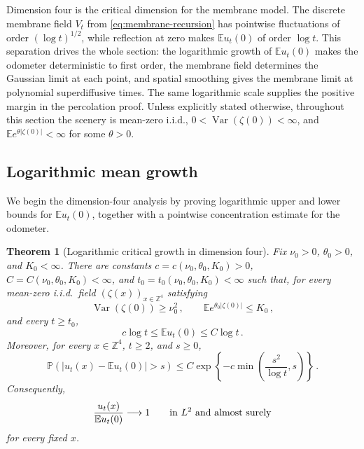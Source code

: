 \documentclass[11pt]{amsart}
\theoremstyle{plain}
\newtheorem{theorem}{Theorem}[section]
\theoremstyle{definition}
\newcommand{\Z}{\mathbb{Z}}
\newcommand{\E}{\mathbb{E}}
\renewcommand{\P}{\mathbb{P}}
\DeclareMathOperator{\Var}{Var}
\begin{document}
Dimension four is the critical dimension for the membrane model. The discrete
membrane field $V_t$ from \eqref{eq:membrane-recursion} has pointwise
fluctuations of order $(\log t)^{1/2}$, while reflection at zero makes
$\E u_t(0)$ of order $\log t$. This separation drives the
whole section: the logarithmic growth of $\E u_t(0)$ makes the odometer deterministic to first
order, the membrane field determines the Gaussian limit at each point, and
spatial smoothing gives the membrane limit at polynomial
superdiffusive times. The same logarithmic scale supplies the positive margin
in the percolation proof.
Unless explicitly stated otherwise, throughout this section the scenery is
mean-zero i.i.d., $0<\Var(\zeta(0))<\infty$, and
$\E e^{\theta|\zeta(0)|}<\infty$ for some $\theta>0$.

\subsection{Logarithmic mean growth}\label{ssec:expl-d4}
We begin the dimension-four analysis by proving logarithmic upper and lower bounds for $\E u_t(0)$, together with a pointwise concentration estimate for the odometer.

		\begin{theorem}[Logarithmic critical growth in dimension four]\label{thm:critical-toppling-d4}
			Fix $\nu_{0}>0$, $\theta_{0}>0$, and $K_{0}<\infty$. There are
			constants $c=c(\nu_{0},\theta_{0},K_{0})>0$,
			$C=C(\nu_{0},\theta_{0},K_{0})<\infty$, and
			$t_0=t_0(\nu_{0},\theta_{0},K_{0})<\infty$ such that, for every mean-zero i.i.d.\ field
			$(\zeta(x))_{x\in\Z^4}$ satisfying
			\[
				\Var(\zeta(0))\geq\nu_{0}^2\, ,
				\qquad
				\E e^{\theta_{0}|\zeta(0)|}\leq K_{0}\, ,
			\]
			and every $t\geq t_0$,
			\begin{equation}\label{eq:d4-logarithmic-mean-bounds}
				c\log t\leq \E u_t(0)\leq C\log t\, .
			\end{equation}
			Moreover, for every $x\in\Z^4$, $t\geq2$, and $s\geq0$,
			\begin{equation}\label{eq:d4-odometer-concentration}
				\P\left(|u_t(x)-\E u_t(0)|>s\right)
				\leq
				C\exp\left\{
					-c\min\left(\frac{s^2}{\log t},s\right)
				\right\}\, .
			\end{equation}
			Consequently,
			\[
				\frac{u_t(x)}{\E u_t(0)}\longrightarrow1
				\qquad\textup{in $L^2$ and almost surely}
			\]
			for every fixed $x$.
		\end{theorem}
\end{document}
